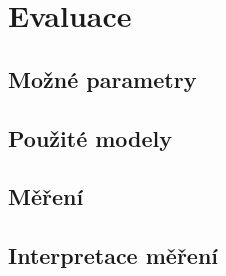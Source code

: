 \chapter{Evaluace}
\section{Možné parametry}
\section{Použité modely}
\section{Měření}
\section{Interpretace měření}
